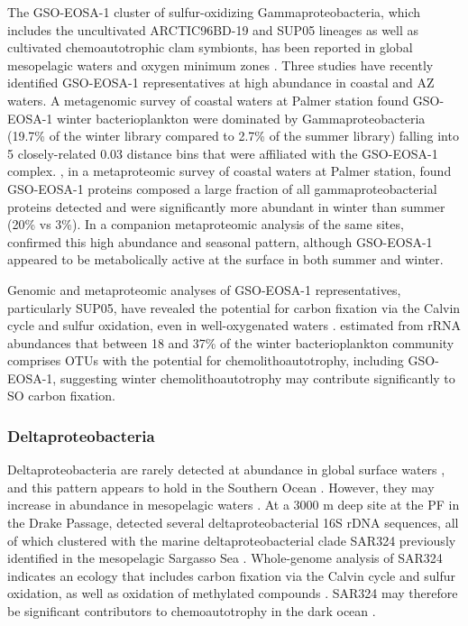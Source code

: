
The GSO-EOSA-1 cluster of sulfur-oxidizing Gammaproteobacteria, which includes the uncultivated ARCTIC96BD-19 and SUP05 lineages as well as cultivated chemoautotrophic clam symbionts, has been reported in global mesopelagic waters \cite{Swan:2011hb} and oxygen minimum zones \cite{Walsh:2009fja,Canfield:2010ib}.
Three studies have recently identified GSO-EOSA-1 representatives at high abundance in coastal and \ac{AZ} waters.
A metagenomic survey of coastal waters at Palmer station found GSO-EOSA-1 winter bacterioplankton were dominated by Gammaproteobacteria (19.7\% of the winter library compared to 2.7\% of the summer library) falling into 5 closely-related 0.03 distance bins that were affiliated with the GSO-EOSA-1 complex.
\cite{Grzymski:2012ej}, in a metaproteomic survey of coastal waters at Palmer station, found GSO-EOSA-1 proteins composed a large fraction of all gammaproteobacterial proteins detected and were significantly more abundant in winter than summer (20\% vs 3\%).
In a companion metaproteomic analysis of the same sites, \cite{Williams:2012bs} confirmed this high abundance and seasonal pattern, although GSO-EOSA-1 appeared to be metabolically active at the surface in both summer and winter.

Genomic and metaproteomic analyses of GSO-EOSA-1 representatives, particularly SUP05, have revealed the potential for carbon fixation via the Calvin cycle and sulfur oxidation, even in well-oxygenated waters \cite{Walsh:2009fja,Swan:2011hb,Grzymski:2012ej}.
\cite{Grzymski:2012ej} estimated from rRNA abundances that between 18 and 37\% of the winter bacterioplankton community comprises \acp{OTU} with the potential for chemolithoautotrophy, including GSO-EOSA-1, suggesting winter chemolithoautotrophy may contribute significantly to \ac{SO} carbon fixation.

\subsubsection{Deltaproteobacteria}

Deltaproteobacteria are rarely detected at abundance in global surface waters \citep[see e.g.][]{Venter:2004hg}, and this pattern appears to hold in the Southern Ocean \cite{Murray:2007db,West:2008kc,Ghiglione:2011ee,Murray:2011ib,Ducklow:2011jl,Jamieson:2012up}.
However, they may increase in abundance in mesopelagic waters \cite{Wright:1997vg,Pham:2008bba,Zaballos:2006hr}.
At a 3000 m deep site at the \ac{PF} in the Drake Passage, \citet{LopezGarcia:2001vp} detected several deltaproteobacterial 16S rDNA sequences, all of which clustered with the marine deltaproteobacterial clade SAR324 previously identified in the mesopelagic Sargasso Sea \cite{Wright:1997vg}.
Whole-genome analysis of SAR324 indicates an ecology that includes carbon fixation via the Calvin cycle and sulfur oxidation, as well as oxidation of methylated compounds \cite{Swan:2011hb}.
SAR324 may therefore be significant contributors to chemoautotrophy in the dark ocean \cite{Swan:2011hb}.

